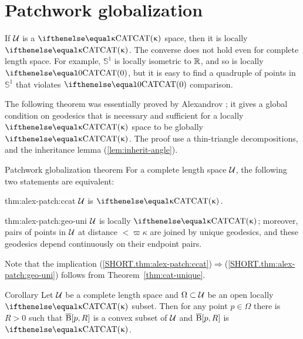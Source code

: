 
\section{Patchwork globalization}\label{sec:patchwork}

If $\mathcal{U}$ is a $\CAT\kappa$ space, then it is locally $\CAT\kappa$.
The converse does not hold even for complete length space.
For example, $\mathbb{S}^1$ is locally isometric to $\mathbb{R}$, and so
is locally $\CAT0$, but it is easy to find a quadruple of points in $\mathbb{S}^1$ that violates $\CAT0$ comparison.  

The following theorem was essentially proved by Alexandrov \cite[Satz 9]{alexandrov:devel}; 
it gives a global condition on geodesics that is  necessary and sufficient for a locally $\CAT\kappa$ space to be globally $\CAT\kappa$. 
The proof use a thin-triangle decompositions, 
and the inheritance lemma (\ref{lem:inherit-angle}). 

\begin{thm}{Patchwork globalization theorem}\label{thm:alex-patch}
For a complete length space $\mathcal{U}$, the following two statements are equivalent:

\begin{subthm}{thm:alex-patch:ccat}
$\mathcal{U}$ is $\CAT\kappa$.
\end{subthm}
 
\begin{subthm}{thm:alex-patch:geo-uni}
$\mathcal{U}$ is locally $\CAT\kappa$; moreover,  pairs of points in $\mathcal{U}$ at distance $<\varpi\kappa$ are joined by unique geodesics, and these geodesics depend continuously on their endpoint pairs.
\end{subthm}

\end{thm}

Note that the implication (\ref{SHORT.thm:alex-patch:ccat})$\Rightarrow$(\ref{SHORT.thm:alex-patch:geo-uni}) follows from Theorem~\ref{thm:cat-unique}.

\begin{thm}{Corollary}\label{cor:k-for-k}
Let $\mathcal{U}$ be a complete length  space 
and $\Omega\subset\spc{U}$ be an open locally $\CAT\kappa$ subset. 
Then for any point $p\in \Omega$ there is $R>0$ such that $\overline{\mathrm{B}}{}[p,R]$ is a convex subset of $\mathcal{U}$ 
and $\overline{\mathrm{B}}{}[p,R]$ is $\CAT\kappa$.
\end{thm}

